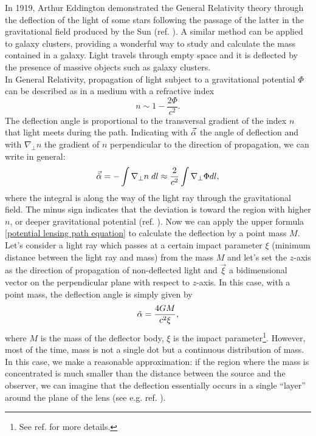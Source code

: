 In 1919, Arthur Eddington demonstrated the General Relativity theory through the deflection of the light of some stars following the passage of the latter in the gravitational field produced by the Sun (ref. \cite{Eddington_GR}).
A similar method can be applied to galaxy clusters, providing a wonderful way to study and calculate the mass contained in a galaxy. Light travels through empty space and it is deflected by the presence of massive objects such as galaxy clusters.\\

In General Relativity, propagation of light subject to a gravitational potential $\Phi$ can be described as in a medium with a refractive index
\begin{equation}
    n \sim 1-\frac{2\Phi}{c^2}.
\end{equation}
The deflection angle is proportional to the transversal gradient of the index $n$ that light meets during the path. Indicating with $\vec{\Tilde{\alpha}}$ the angle of deflection and with $\nabla_{\perp}n$ the gradient of $n$ perpendicular to the direction of propagation, we can write in general:
\begin{equation}\label{potential lensing path equation}
    \vec{\Tilde{\alpha}} = - \int \nabla_\perp n \;dl \approx \frac{2}{c^2} \int \nabla_\perp \Phi dl,
\end{equation}
where the integral is along the way of the light ray through the gravitational field. The minus sign indicates that the deviation is toward the region with higher $n$, or deeper gravitational potential (ref. \cite{Lectures_Gravitational_Lensing}).
Now we can apply the upper formula \eqref{potential lensing path equation} to calculate the deflection by a point mass $M$.\\ Let's consider a light ray which passes at a certain impact parameter $\xi$ (minimum distance between the light ray and mass) from the mass $M$ and let's set the $z$-axis as the direction of propagation of non-deflected light and $\vec{\xi}$ a bidimensional vector on the perpendicular plane with respect to $z$-axis. In this case, with a point mass, the deflection angle is simply given by
\begin{equation}\label{alpha reduced}
    \Tilde{\alpha} = \frac{4GM}{c^2 \xi},
\end{equation}
where $M$ is the mass of the deflector body, $\xi$ is the impact parameter\footnote{See ref. \cite{Lectures_Gravitational_Lensing} for more details.}.
However, most of the time, mass is not a single dot but a continuous distribution of mass. In this case, we make a reasonable approximation: if the region where the mass is concentrated is much smaller than the distance between the source and the observer, we can imagine that the deflection essentially occurs in a single “layer” around the plane of the lens (see e.g. ref. \cite{PhDPizzuti}).\\
